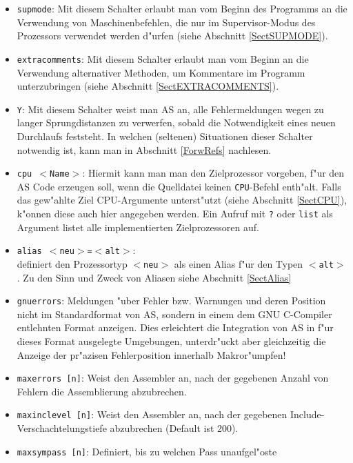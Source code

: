 \documentclass[12pt,a4paper,twoside]{report}
\newcommand{\tty}[1]{{\tt #1}}
\newcommand{\asname}{AS}
\begin{document}
\begin{itemize}
{      (siehe Abschnitt \ref{SectINTSYNTAX} f"ur eine Liste erlaubter
      Argumente).}
\item{\tty{supmode}: Mit diesem Schalter erlaubt man vom Beginn des Programms
      an die Verwendung von Maschinenbefehlen, die nur im Supervisor-Modus
      des Prozessors verwendet werden d"urfen (siehe Abschnitt \ref{SectSUPMODE}).}
\item{\tty{extracomments}: Mit diesem Schalter erlaubt man vom Beginn
      an die Verwendung alternativer Methoden, um Kommentare im Programm
      unterzubringen (siehe Abschnitt \ref{SectEXTRACOMMENTS}).}
\item{\tty{Y}: Mit diesem Schalter weist man \asname{} an, alle Fehlermeldungen
      wegen zu langer Sprungdistanzen zu verwerfen, sobald die Notwendigkeit
      eines neuen Durchlaufs feststeht.  In welchen (seltenen) Situationen
      dieser Schalter notwendig ist, kann man in Abschnitt \ref{ForwRefs}
      nachlesen.}
\item{\tty{cpu $<$Name$>$}: Hiermit kann man man den Zielprozessor
      vorgeben, f"ur den \asname{} Code erzeugen soll, wenn die Quelldatei keinen
      {\tt CPU}-Befehl enth"alt.
      Falls das gew"ahlte Ziel CPU-Argumente unterst"utzt (siehe Abschnitt
      \ref{SectCPU}), k"onnen diese auch hier angegeben werden.  Ein Aufruf
      mit \verb!?! oder {\tt list} als Argument listet alle implementierten
      Zielprozessoren auf.}
\item{\tty{alias $<$neu$>$=$<$alt$>$}:\\
      definiert den Prozessortyp \tty{$<$neu$>$} als einen Alias f"ur den
      Typen \tty{$<$alt$>$}.  Zu den Sinn und Zweck von Aliasen siehe
      Abschnitt \ref{SectAlias}}
\item{{\tt gnuerrors}: Meldungen "uber Fehler bzw. Warnungen und deren
      Position nicht im Standardformat von \asname{}, sondern in einem dem GNU
      C-Compiler entlehnten Format anzeigen.  Dies erleichtert die
      Integration von \asname{} in f"ur dieses Format ausgelegte Umgebungen,
      unterdr"uckt aber gleichzeitig die Anzeige der pr"azisen
      Fehlerposition innerhalb Makror"umpfen!}
\item{{\tt maxerrors [n]}: Weist den Assembler an, nach der gegebenen
      Anzahl von Fehlern die Assemblierung abzubrechen.}
\item{{\tt maxinclevel [n]}: Weist den Assembler an, nach der gegebenen
      Include-Verschachtelungstiefe abzubrechen (Default ist 200).}
\item{{\tt maxsympass [n]}: Definiert, bis zu welchen Pass unaufgel"oste
}
\end{itemize}
\end{document}
